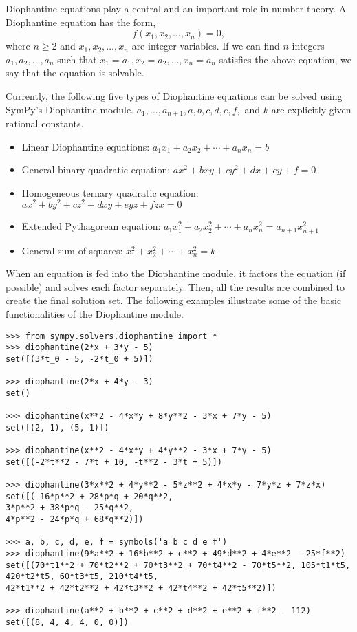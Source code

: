 Diophantine equations play a central and an important role in number theory.  A
Diophantine equation has the form, $$f(x_1, x_2, \dotsc, x_n) = 0,$$ where $n \geq
2$ and $x_1, x_2, \dotsc, x_n$ are integer variables. If we can find $n$
integers $a_1, a_2, \dotsc, a_n$ such that $x_1 = a_1, x_2 = a_2, \dotsc, x_n =
a_n$ satisfies the above equation, we say that the equation is solvable.

Currently, the following five types of Diophantine equations can be solved using
SymPy's Diophantine module. $a_1, \ldots, a_{n+1}, a, b, c, d, e,
f,$ and $k$ are explicitly given rational constants.

\begin{itemize}
    \item Linear Diophantine equations: $a_1x_1 + a_2x_2 + \dotsb{} + a_{n}x_{n} = b$
    \item General binary quadratic equation: $ax^2 + bxy + cy^2 + dx + ey + f = 0$
    \item Homogeneous ternary quadratic equation: $ax^2 + by^2 + cz^2 + dxy + eyz + fzx = 0$
    \item Extended Pythagorean equation: $a_{1}x_{1}^2 + a_{2}x_{2}^2 + \dotsb{} + a_{n}x_{n}^2 = a_{n+1}x_{n+1}^2$
    \item General sum of squares: $x_{1}^2 + x_{2}^2 + \dotsb{} + x_{n}^2 = k$
\end{itemize}

When an equation is fed into the Diophantine module, it factors the equation (if
possible) and solves each factor separately. Then, all the results are combined
to create the final solution set. The following examples illustrate some of the
basic functionalities of the Diophantine module.

\begin{verbatim}
>>> from sympy.solvers.diophantine import *
>>> diophantine(2*x + 3*y - 5)
set([(3*t_0 - 5, -2*t_0 + 5)])

>>> diophantine(2*x + 4*y - 3)
set()

>>> diophantine(x**2 - 4*x*y + 8*y**2 - 3*x + 7*y - 5)
set([(2, 1), (5, 1)])

>>> diophantine(x**2 - 4*x*y + 4*y**2 - 3*x + 7*y - 5)
set([(-2*t**2 - 7*t + 10, -t**2 - 3*t + 5)])

>>> diophantine(3*x**2 + 4*y**2 - 5*z**2 + 4*x*y - 7*y*z + 7*z*x)
set([(-16*p**2 + 28*p*q + 20*q**2,
3*p**2 + 38*p*q - 25*q**2,
4*p**2 - 24*p*q + 68*q**2)])

>>> a, b, c, d, e, f = symbols('a b c d e f')
>>> diophantine(9*a**2 + 16*b**2 + c**2 + 49*d**2 + 4*e**2 - 25*f**2)
set([(70*t1**2 + 70*t2**2 + 70*t3**2 + 70*t4**2 - 70*t5**2, 105*t1*t5,
420*t2*t5, 60*t3*t5, 210*t4*t5,
42*t1**2 + 42*t2**2 + 42*t3**2 + 42*t4**2 + 42*t5**2)])

>>> diophantine(a**2 + b**2 + c**2 + d**2 + e**2 + f**2 - 112)
set([(8, 4, 4, 4, 0, 0)])
\end{verbatim}
